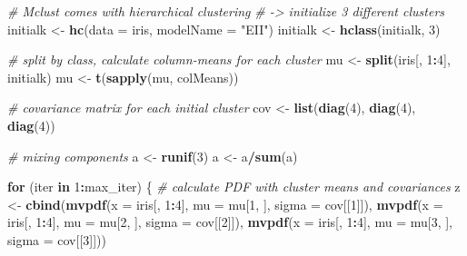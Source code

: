 \documentclass[12pt]{article}
\newenvironment{Shaded}{\begin{snugshade}}{\end{snugshade}}
\newcommand{\AttributeTok}[1]{\textcolor[rgb]{0.13,0.29,0.53}{#1}}
\newcommand{\CommentTok}[1]{\textcolor[rgb]{0.56,0.35,0.01}{\textit{#1}}}
\newcommand{\ControlFlowTok}[1]{\textcolor[rgb]{0.13,0.29,0.53}{\textbf{#1}}}
\newcommand{\DecValTok}[1]{\textcolor[rgb]{0.00,0.00,0.81}{#1}}
\newcommand{\FunctionTok}[1]{\textcolor[rgb]{0.13,0.29,0.53}{\textbf{#1}}}
\newcommand{\NormalTok}[1]{#1}
\newcommand{\OtherTok}[1]{\textcolor[rgb]{0.56,0.35,0.01}{#1}}
\newcommand{\SpecialCharTok}[1]{\textcolor[rgb]{0.81,0.36,0.00}{\textbf{#1}}}
\newcommand{\StringTok}[1]{\textcolor[rgb]{0.31,0.60,0.02}{#1}}
\begin{document}
\begin{Shaded}
\begin{Highlighting}[]
\CommentTok{\# Mclust comes with hierarchical clustering}
\CommentTok{\# {-}\textgreater{} initialize 3 different clusters}
\NormalTok{initialk }\OtherTok{\textless{}{-}} \FunctionTok{hc}\NormalTok{(}\AttributeTok{data =}\NormalTok{ iris, }\AttributeTok{modelName =} \StringTok{"EII"}\NormalTok{)}
\NormalTok{initialk }\OtherTok{\textless{}{-}} \FunctionTok{hclass}\NormalTok{(initialk, }\DecValTok{3}\NormalTok{)}

\CommentTok{\# split by class, calculate column{-}means for each cluster}
\NormalTok{mu }\OtherTok{\textless{}{-}} \FunctionTok{split}\NormalTok{(iris[, }\DecValTok{1}\SpecialCharTok{:}\DecValTok{4}\NormalTok{], initialk)}
\NormalTok{mu }\OtherTok{\textless{}{-}} \FunctionTok{t}\NormalTok{(}\FunctionTok{sapply}\NormalTok{(mu, colMeans))}

\CommentTok{\# covariance matrix for each initial cluster}
\NormalTok{cov }\OtherTok{\textless{}{-}} \FunctionTok{list}\NormalTok{(}\FunctionTok{diag}\NormalTok{(}\DecValTok{4}\NormalTok{), }\FunctionTok{diag}\NormalTok{(}\DecValTok{4}\NormalTok{), }\FunctionTok{diag}\NormalTok{(}\DecValTok{4}\NormalTok{))}

\CommentTok{\# mixing components}
\NormalTok{a }\OtherTok{\textless{}{-}} \FunctionTok{runif}\NormalTok{(}\DecValTok{3}\NormalTok{)}
\NormalTok{a }\OtherTok{\textless{}{-}}\NormalTok{ a}\SpecialCharTok{/}\FunctionTok{sum}\NormalTok{(a)}

\ControlFlowTok{for}\NormalTok{ (iter }\ControlFlowTok{in} \DecValTok{1}\SpecialCharTok{:}\NormalTok{max\_iter) \{}
\CommentTok{\# calculate PDF with cluster means and covariances}
\NormalTok{z }\OtherTok{\textless{}{-}} \FunctionTok{cbind}\NormalTok{(}\FunctionTok{mvpdf}\NormalTok{(}\AttributeTok{x =}\NormalTok{ iris[, }\DecValTok{1}\SpecialCharTok{:}\DecValTok{4}\NormalTok{], }\AttributeTok{mu =}\NormalTok{ mu[}\DecValTok{1}\NormalTok{, ], }\AttributeTok{sigma =}\NormalTok{ cov[[}\DecValTok{1}\NormalTok{]]),}
           \FunctionTok{mvpdf}\NormalTok{(}\AttributeTok{x =}\NormalTok{ iris[, }\DecValTok{1}\SpecialCharTok{:}\DecValTok{4}\NormalTok{], }\AttributeTok{mu =}\NormalTok{ mu[}\DecValTok{2}\NormalTok{, ], }\AttributeTok{sigma =}\NormalTok{ cov[[}\DecValTok{2}\NormalTok{]]),}
           \FunctionTok{mvpdf}\NormalTok{(}\AttributeTok{x =}\NormalTok{ iris[, }\DecValTok{1}\SpecialCharTok{:}\DecValTok{4}\NormalTok{], }\AttributeTok{mu =}\NormalTok{ mu[}\DecValTok{3}\NormalTok{, ], }\AttributeTok{sigma =}\NormalTok{ cov[[}\DecValTok{3}\NormalTok{]]))}


\end{Highlighting}
\end{Shaded}
\end{document}

